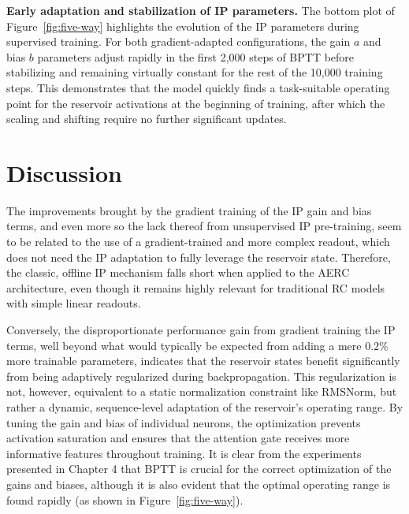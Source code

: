 \documentclass{sapthesis}
\begin{document}
\textbf{Early adaptation and stabilization of IP parameters.}
The bottom plot of Figure~\ref{fig:five-way} highlights the evolution of the IP parameters during supervised training. For both gradient-adapted configurations, the gain $a$ and bias $b$ parameters adjust rapidly in the first 2,000 steps of BPTT before stabilizing and remaining virtually constant for the rest of the 10,000 training steps. This demonstrates that the model quickly finds a task-suitable operating point for the reservoir activations at the beginning of training, after which the scaling and shifting require no further significant updates.


\chapter{Discussion}
The improvements brought by the gradient training of the IP gain and bias terms, and even more so the lack thereof from unsupervised IP pre-training, seem to be related to the use of a gradient-trained and more complex readout, which does not need the IP adaptation to fully leverage the reservoir state. Therefore, the classic, offline IP mechanism falls short when applied to the AERC architecture, even though it remains highly relevant for traditional RC models with simple linear readouts.

Conversely, the disproportionate performance gain from gradient training the IP terms, well beyond what would typically be expected from adding a mere $0.2\%$ more trainable parameters, indicates that the reservoir states benefit significantly from being adaptively regularized during backpropagation. This regularization is not, however, equivalent to a static normalization constraint like RMSNorm, but rather a dynamic, sequence-level adaptation of the reservoir's operating range. By tuning the gain and bias of individual neurons, the optimization prevents activation saturation and ensures that the attention gate receives more informative features throughout training.
It is clear from the experiments presented in Chapter 4 that BPTT is crucial for the correct optimization of the gains and biases, although it is also evident that the optimal operating range is found rapidly (as shown in Figure~\ref{fig:five-way}).
\end{document}
